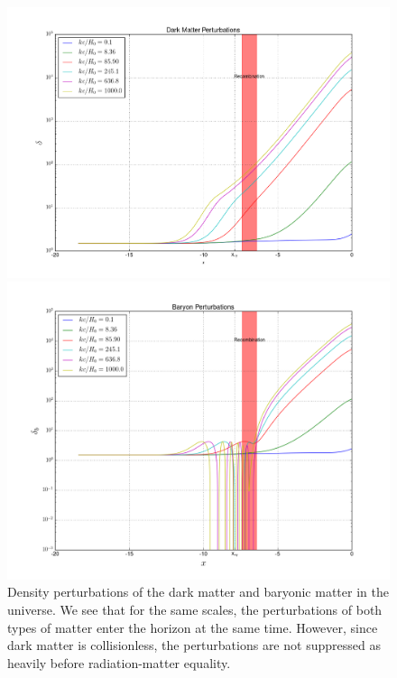 \documentclass[a4paper]{article}
\begin{document}
\begin{figure}[ht!]
\label{fig:delta}
\centering
\begin{minipage}{0.5\textwidth}
\centering
\includegraphics[width=1.0\linewidth]{delta}
\end{minipage}%
\begin{minipage}{0.5\textwidth}
\centering
\includegraphics[width=1.0\linewidth]{delta_b}
\end{minipage}
\caption{Density perturbations of the dark matter and baryonic matter in the universe. We see that for the same scales, the perturbations of both types of matter enter the horizon at the same time. However, since dark matter is collisionless, the perturbations are not suppressed as heavily before radiation-matter equality.}
\end{figure}
\end{document}
